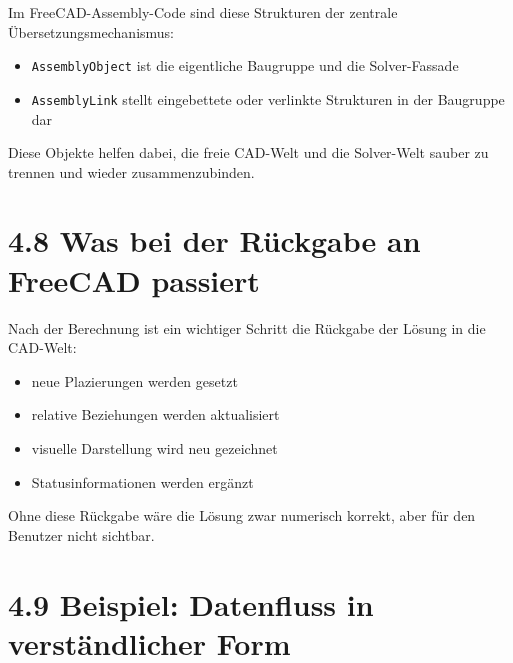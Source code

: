 \documentclass[
  12pt
]{book}
\providecommand{\tightlist}{%
  \setlength{\itemsep}{0pt}\setlength{\parskip}{0pt}}
\begin{document}
Im FreeCAD-Assembly-Code sind diese Strukturen der zentrale
Übersetzungsmechanismus:

\begin{itemize}
\tightlist
\item
  \texttt{AssemblyObject} ist die eigentliche Baugruppe und die
  Solver-Fassade
\item
  \texttt{AssemblyLink} stellt eingebettete oder verlinkte Strukturen in
  der Baugruppe dar
\end{itemize}

Diese Objekte helfen dabei, die freie CAD-Welt und die Solver-Welt
sauber zu trennen und wieder zusammenzubinden.

\hypertarget{was-bei-der-ruxfcckgabe-an-freecad-passiert}{%
\section{\texorpdfstring{{4.8} Was bei der Rückgabe an FreeCAD
passiert}{4.8 Was bei der Rückgabe an FreeCAD passiert}}\label{was-bei-der-ruxfcckgabe-an-freecad-passiert}}

Nach der Berechnung ist ein wichtiger Schritt die Rückgabe der Lösung in
die CAD-Welt:

\begin{itemize}
\tightlist
\item
  neue Plazierungen werden gesetzt
\item
  relative Beziehungen werden aktualisiert
\item
  visuelle Darstellung wird neu gezeichnet
\item
  Statusinformationen werden ergänzt
\end{itemize}

Ohne diese Rückgabe wäre die Lösung zwar numerisch korrekt, aber für den
Benutzer nicht sichtbar.

\hypertarget{beispiel-datenfluss-in-verstuxe4ndlicher-form}{%
\section{\texorpdfstring{{4.9} Beispiel: Datenfluss in verständlicher
Form}{4.9 Beispiel: Datenfluss in verständlicher Form}}\label{beispiel-datenfluss-in-verstuxe4ndlicher-form}}
\end{document}
